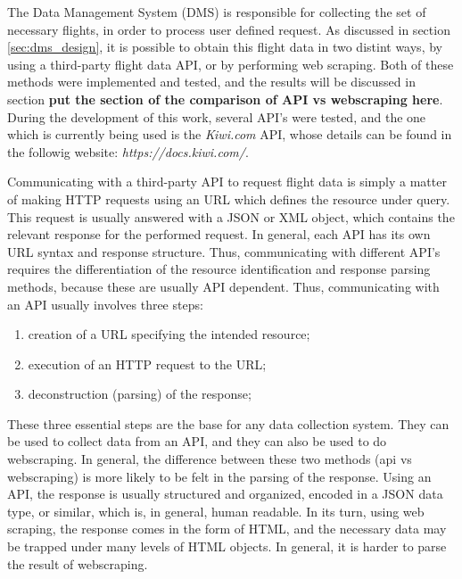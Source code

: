 The Data Management System (DMS) is responsible for collecting the set of necessary flights,
in order to process user defined request.
As discussed in section \ref{sec:dms_design}, it is possible to obtain this flight data 
in two distint ways, by using a third-party flight data API, or by performing web scraping.
Both of these methods were implemented and tested, and the results will be discussed in section \textbf{put the section 
of the comparison of API vs webscraping here}. During the development of this work, several API's were tested, and the one which is currently being used
is the \textit{Kiwi.com} API, whose details can be found in the followig website: \textit{https://docs.kiwi.com/}. 


Communicating with a third-party API to request flight data is simply a matter of making HTTP requests
using an URL which defines the resource under query. This request is usually answered with a 
JSON or XML object, which contains the relevant response for the performed request.
In general, each API has its own URL syntax and response structure. Thus, communicating with different 
API's requires the differentiation of the resource identification and response parsing methods,
because these are usually API dependent. 
Thus, communicating with an API usually involves three steps:

\begin{enumerate}[noitemsep,topsep=0pt,parsep=0pt,partopsep=0pt]
  \item creation of a URL specifying the intended resource;
  \item execution of an HTTP request to the URL;
  \item deconstruction (parsing) of the response;
\end{enumerate}

These three essential steps are the base for any data collection system. They can be used to collect data from an API,
and they can also be used to do webscraping. In general, the difference between these two methods (api vs webscraping)
is more likely to be felt in the parsing of the response. Using an API,
the response is usually structured and organized, encoded in a JSON data type, or similar,
which is, in general, human readable.
In its turn, using web scraping, the response comes in the form of HTML, and the necessary data 
may be trapped under many levels of HTML objects. In general, it is harder to parse the result of webscraping.

